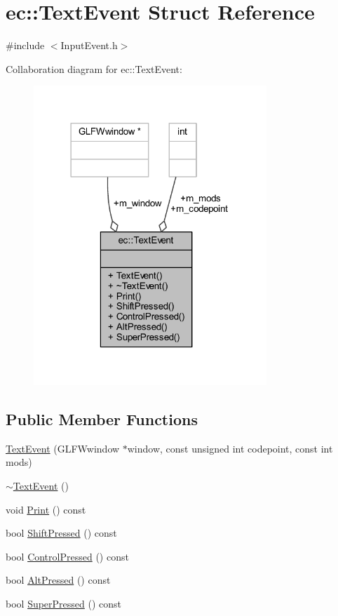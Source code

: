 \hypertarget{structec_1_1_text_event}{}\section{ec\+:\+:Text\+Event Struct Reference}
\label{structec_1_1_text_event}


{\ttfamily \#include $<$Input\+Event.\+h$>$}



Collaboration diagram for ec\+:\+:Text\+Event\+:\nopagebreak
\begin{figure}[H]
\begin{center}
\leavevmode
\includegraphics[width=249pt]{structec_1_1_text_event__coll__graph}
\end{center}
\end{figure}
\subsection*{Public Member Functions}
\begin{DoxyCompactItemize}
\item 
\mbox{\hyperlink{structec_1_1_text_event_a1bb5d951c9c280ed869a5dbfdbdf4f93}{Text\+Event}} (G\+L\+F\+Wwindow $\ast$window, const unsigned int codepoint, const int mods)
\item 
\mbox{\hyperlink{structec_1_1_text_event_af6cb457ef115f8fd434aa40c0e4eb71e}{$\sim$\+Text\+Event}} ()
\item 
void \mbox{\hyperlink{structec_1_1_text_event_a125ea7b7070407b7ffaf480b8683e445}{Print}} () const
\item 
bool \mbox{\hyperlink{structec_1_1_text_event_a86e2bd32a44e7dafd1707a45467b2034}{Shift\+Pressed}} () const
\item 
bool \mbox{\hyperlink{structec_1_1_text_event_acc7283b28fbfe3b5c4f04d1eac37f3ff}{Control\+Pressed}} () const
\item 
bool \mbox{\hyperlink{structec_1_1_text_event_a9844b3bd66c68190741a3238ad1907cd}{Alt\+Pressed}} () const
\item 
bool \mbox{\hyperlink{structec_1_1_text_event_ade817e63b5b9c596bf176dbdd2884f10}{Super\+Pressed}} () const
\end{DoxyCompactItemize}
